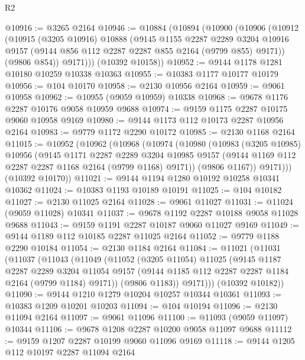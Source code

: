 \begin{lexlean}{R2}
\begin{coremodule}
@10916 := @3265 @2164
@10946 := @10884
    (@10894
      (@10900
        (@10906
          (@10912
            (@10915
              (@3205 @10916)
              @10888
              (@9145
                @1155
                @2287
                @2289
                @3204
                @10916
                @9157
                (@9144 @856 @112 @2287 @2287 @855 @2164 (@9799 @855) @9171))
              (@9806 @854))
            @9171)))
      (@10392 @10158))
@10952 := @9144 @1178 @1281 @10180 @10259 @10338 @10363
@10955 := @10383 @1177 @10177 @10179
@10956 := @104 @10170
@10958 := @2130 @10956 @2164
@10959 := @9061 @10958
@10962 := @10955 (@9059 @10959) @10338
@10968 := @9678 @1176 @2287 @10176 @9058 @10959 @9688
@10974 := @9159 @1175 @2287 @10175 @9060 @10958 @9169
@10980 := @9144 @1173 @112 @10173 @2287 @10956 @2164
@10983 := @9779 @1172 @2290 @10172
@10985 := @2130 @1168 @2164
@11015 := @10952
    (@10962
      (@10968
        (@10974
          (@10980
            (@10983
              (@3205 @10985)
              @10956
              (@9145
                @1171
                @2287
                @2289
                @3204
                @10985
                @9157
                (@9144 @1169 @112 @2287 @2287 @1168 @2164 (@9799 @1168) @9171))
              (@9806 @1167))
            @9171)))
      (@10392 @10170))
@11021 := @9144 @1194 @1280 @10192 @10258 @10341 @10362
@11024 := @10383 @1193 @10189 @10191
@11025 := @104 @10182
@11027 := @2130 @11025 @2164
@11028 := @9061 @11027
@11031 := @11024 (@9059 @11028) @10341
@11037 := @9678 @1192 @2287 @10188 @9058 @11028 @9688
@11043 := @9159 @1191 @2287 @10187 @9060 @11027 @9169
@11049 := @9144 @1189 @112 @10185 @2287 @11025 @2164
@11052 := @9779 @1188 @2290 @10184
@11054 := @2130 @1184 @2164
@11084 := @11021
    (@11031
      (@11037
        (@11043
          (@11049
            (@11052
              (@3205 @11054)
              @11025
              (@9145
                @1187
                @2287
                @2289
                @3204
                @11054
                @9157
                (@9144 @1185 @112 @2287 @2287 @1184 @2164 (@9799 @1184) @9171))
              (@9806 @1183))
            @9171)))
      (@10392 @10182))
@11090 := @9144 @1210 @1279 @10204 @10257 @10344 @10361
@11093 := @10383 @1209 @10201 @10203
@11094 := @104 @10194
@11096 := @2130 @11094 @2164
@11097 := @9061 @11096
@11100 := @11093 (@9059 @11097) @10344
@11106 := @9678 @1208 @2287 @10200 @9058 @11097 @9688
@11112 := @9159 @1207 @2287 @10199 @9060 @11096 @9169
@11118 := @9144 @1205 @112 @10197 @2287 @11094 @2164

\end{coremodule}
\end{lexlean}
